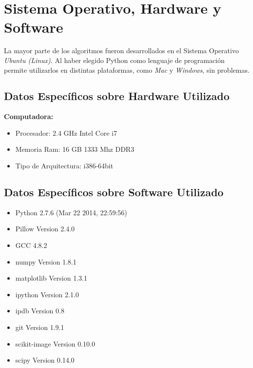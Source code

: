 \section{Sistema Operativo, Hardware y Software}
	La mayor parte de los algoritmos fueron desarrollados en el Sistema Operativo \textit{Ubuntu (Linux)}. Al haber elegido Python como lenguaje de programación permite utilizarlos en distintas plataformas, como \textit{Mac} y \textit{Windows}, sin problemas.
	
	\subsection{Datos Específicos sobre Hardware Utilizado}
		\textbf{Computadora:}
		\begin{itemize}
			\item Procesador: 2.4 GHz Intel Core i7
			\item Memoria Ram: 16 GB 1333 Mhz DDR3
			\item Tipo de Arquitectura: i386-64bit
		\end{itemize}
		
	\subsection{Datos Específicos sobre Software Utilizado}
		\begin{itemize}
			\item Python 2.7.6 (Mar 22 2014, 22:59:56) 
			\item Pillow Version 2.4.0
			\item GCC 4.8.2
			\item numpy Version 1.8.1
			\item matplotlib Version 1.3.1
			\item ipython Version 2.1.0
			\item ipdb Version 0.8
			\item git Version 1.9.1
			\item scikit-image Version 0.10.0
			\item scipy Version 0.14.0
		\end{itemize}

    \newpage
